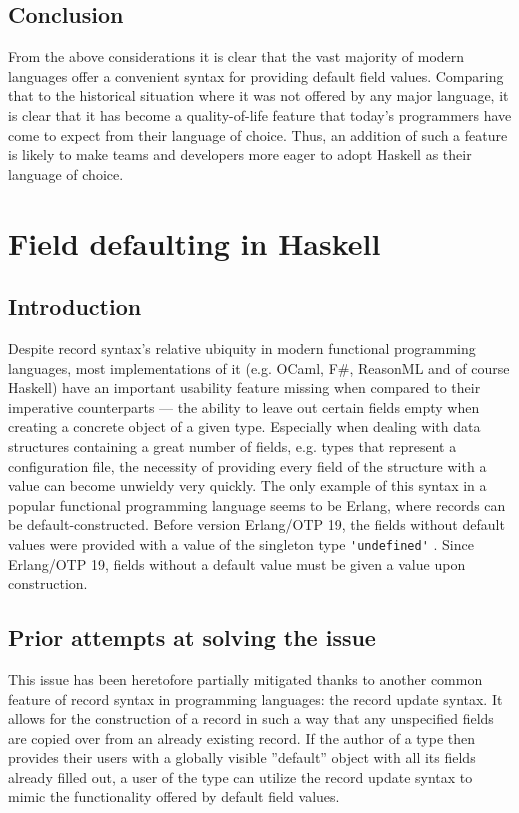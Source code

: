 \documentclass[en]{pracamgr}
\newcommand{\code}[1]{\lstinline[breaklines=true]{#1}}
\begin{document}
\subsection{Conclusion}
From the above considerations it is clear that the vast majority of modern languages 
offer a convenient syntax for providing default field values. 
Comparing that to the historical situation where it was not offered by any major language,
it is clear that it has become a quality-of-life feature 
that today's programmers have come to expect from their language of choice.
Thus, an addition of such a feature is likely to make teams and developers more eager to adopt Haskell as their language of choice.

\section{Field defaulting in Haskell}
\subsection{Introduction}
Despite record syntax's relative ubiquity in modern functional programming languages, most implementations
of it (e.g. OCaml, F\#, ReasonML and of course Haskell) have an important usability feature missing when compared
to their imperative counterparts --- the ability to leave out certain fields empty
when creating a concrete object of a given type. Especially when dealing with
data structures containing a great number of fields, e.g. types that represent
a configuration file, the necessity of providing every field 
of the structure with a value can become unwieldy very quickly. 
The only example of this syntax in a popular functional programming language seems to be Erlang,
where records can be default-constructed. Before version Erlang/OTP 19, the fields without default values were provided 
with a value of the singleton type \code{'undefined'} \cite{ErlangRecords}. 
Since Erlang/OTP 19, fields without a default value must be given a value upon construction.

\subsection{Prior attempts at solving the issue}\label{ss:prior}
This issue has been heretofore partially mitigated thanks to another common feature of record syntax in programming languages: the record update syntax. 
It allows for the construction of a record in such a way that any unspecified fields are copied over from an already existing record. 
If the author of a type then provides their users with a globally visible ''default'' object with all its fields already filled out, 
a user of the type can utilize the record update syntax to mimic the functionality offered by default field values.
\end{document}

